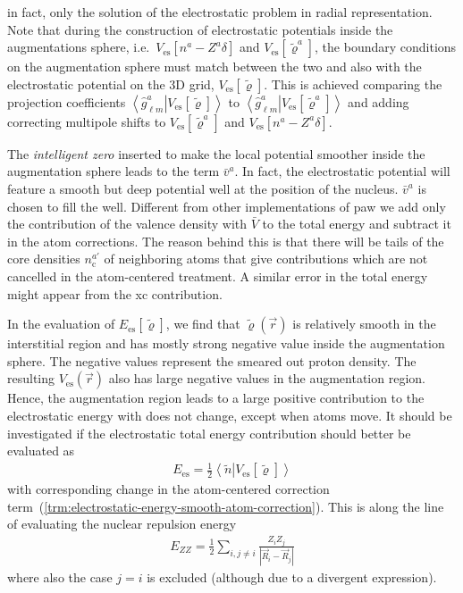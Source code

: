\documentclass[oribibl]{llncs}
\newcommand{\um}[1]{_{\mathrm{#1}}}
\newcommand{\braket}[2]{\left\langle \left. #1 \right| #2 \right\rangle}
\begin{document}
in fact, only the solution of the electrostatic problem in radial representation. 
Note that during the construction of electrostatic potentials inside the augmentations sphere,
i.e.~$V\um{es}[n^a - Z^a \delta]$ and $V\um{es}[\tilde\varrho^a]$, the boundary conditions on the augmentation sphere must match between
the two and also with the electrostatic potential on the 3D grid, $V\um{es}[\tilde\varrho]$.
This is achieved comparing the projection coefficients $\braket{\hat g^a_{\ell m}}{V\um{es}[\tilde\varrho]}$ to $\braket{\hat g^a_{\ell m}}{V\um{es}[\tilde\varrho^a]}$ and adding correcting multipole shifts to $V\um{es}[\tilde\varrho^a]$ and $V\um{es}[n^a - Z^a\delta]$.

The \emph{intelligent zero} inserted to make the local potential smoother inside the augmentation sphere
leads to the term $\bar v^a$. In fact, the electrostatic potential will feature a smooth but deep potential well
at the position of the nucleus. $\bar v^a$ is chosen to fill the well.
Different from other implementations of \ac{paw} we add only the contribution of the valence density
with $\bar V$ to the total energy and subtract it in the atom corrections.
The reason behind this is that there will be tails of the core densities $n^{a'}\um{c}$
of neighboring atoms that give contributions which are not cancelled in the atom-centered treatment.
A similar error in the total energy might appear from the \ac{xc} contribution.


In the evaluation of $E\um{es}[\tilde\varrho]$, 
we find that $\tilde\varrho(\vec r)$ is relatively smooth in the interstitial region
and has mostly strong negative value inside the augmentation sphere. 
The negative values represent the smeared out proton density.
The resulting $V\um{es}(\vec r)$ also has large negative values in the augmentation region.
Hence, the augmentation region leads to a large positive contribution to the
electrostatic energy with does not change, except when atoms move.
It should be investigated if the electrostatic total energy contribution should
better be evaluated as
\begin{align}
  E\um{es} = \frac{1}{2} \braket{ \tilde n }{ V\um{es}[\tilde\varrho] } 
\end{align}
with corresponding change in the atom-centered correction term~(\ref{trm:electrostatic-energy-smooth-atom-correction}).
This is along the line of evaluating the nuclear repulsion energy
\begin{align}
  E_{ZZ} = \frac{1}{2} \sum_{i, j \neq i} \frac{Z_i Z_j}{|\vec R_i - \vec R_j|}
\end{align}
where also the case $j = i$ is excluded (although due to a divergent expression).
\end{document}

